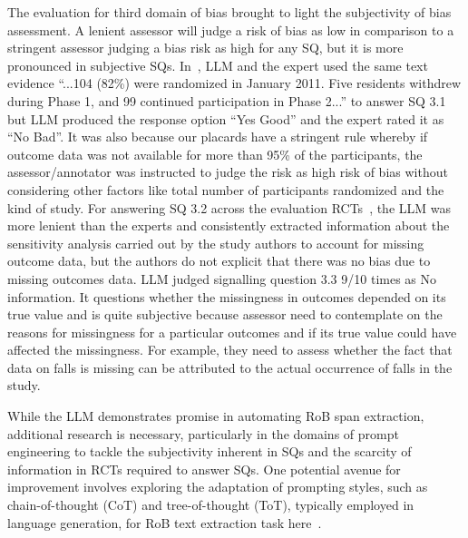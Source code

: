 \documentclass[sn-mathphys,Numbered]{sn-jnl}%
\theoremstyle{thmstyleone}%
\theoremstyle{thmstyletwo}%
\theoremstyle{thmstylethree}%
\begin{document}
The evaluation for third domain of bias brought to light the subjectivity of bias assessment. 
A lenient assessor will judge a risk of bias as low in comparison to a stringent assessor judging a bias risk as high for any SQ, but it is more pronounced in subjective SQs.
In~\cite{thorndike2014activity}, LLM and the expert used the same text evidence ``...104 (82\%) were randomized in January 2011. Five residents withdrew during Phase 1, and 99 continued participation in Phase 2...'' to answer SQ 3.1 but LLM produced the response option ``Yes Good'' and the expert rated it as ``No Bad''.
It was also because our placards have a stringent rule whereby if outcome data was not available for more than 95\% of the participants, the assessor/annotator was instructed to judge the risk as high risk of bias without considering other factors like total number of participants randomized and the kind of study.
For answering SQ 3.2 across the evaluation RCTs~\cite{myer2018integration,taylor2016novel}, the LLM was more lenient than the experts and consistently extracted information about the sensitivity analysis carried out by the study authors to account for missing outcome data, but the authors do not explicit that there was no bias due to missing outcomes data.
LLM judged signalling question 3.3 9/10 times as No information.
It questions whether the missingness in outcomes depended on its true value and is quite subjective because assessor need to contemplate on the reasons for missingness for a particular outcomes and if its true value could have affected the missingness.
For example, they need to assess whether the fact that data on falls is missing can be attributed to the actual occurrence of falls in the study.





While the LLM demonstrates promise in automating RoB span extraction, additional research is necessary, particularly in the domains of prompt engineering to tackle the subjectivity inherent in SQs and the scarcity of information in RCTs required to answer SQs.
One potential avenue for improvement involves exploring the adaptation of prompting styles, such as chain-of-thought (CoT) and tree-of-thought (ToT), typically employed in language generation, for RoB text extraction task here~\cite{wei2022chain}.
%
%
%
\end{document}
